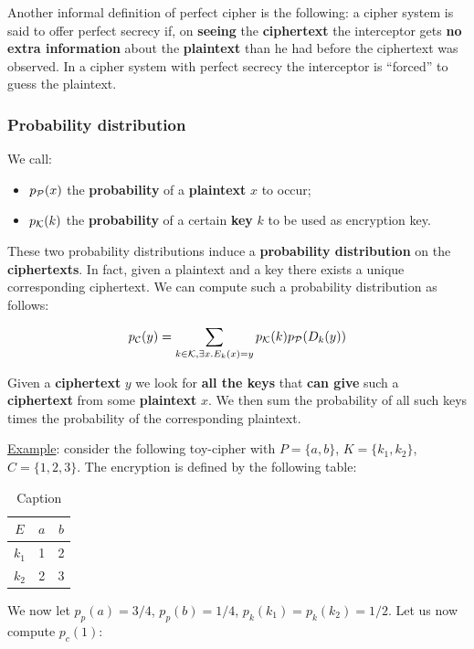 Another informal definition of perfect cipher is the following: a cipher system is said to offer perfect secrecy if, on \textbf{seeing} the \textbf{ciphertext} the interceptor gets \textbf{no extra information} about the \textbf{plaintext} than he had before the ciphertext was observed. In a cipher system with perfect secrecy the interceptor is “forced” to guess the plaintext.

\subsubsection{Probability distribution}

We call:

\begin{itemize}
    \item $p_{\cal P}(x)$ the \textbf{probability} of a \textbf{plaintext} $x$ to occur;
    \item $p_{\cal K}(k)$ the \textbf{probability} of a certain \textbf{key} $k$ to be used as encryption key.
\end{itemize}

These two probability distributions induce a \textbf{probability distribution} on the \textbf{ciphertexts}. In fact, given a plaintext and a key there exists a unique corresponding ciphertext. We can compute such a probability distribution as follows:

$$
p_{\cal C}(y) = \displaystyle \sum_{k \in {\cal K}, \exists x . E_k(x)=y} {p_{\cal K}(k) p_{\cal P}(D_k(y))}
$$

Given a \textbf{ciphertext} $y$ we look for \textbf{all the keys} that \textbf{can give} such a \textbf{ciphertext} from some \textbf{plaintext} $x$. We then sum the probability of all such keys times the probability of the corresponding plaintext.

\underline{Example}: consider the following toy-cipher with $P = \{a,b\}$, $K = \{k_1,k_2\}$, $C = \{1,2,3\}$. The encryption is defined by the following table:

\begin{table}[h!]
    \centering
    \begin{tabular}{c|c|c}
        $E$ & $a$ & $b$ \\
        \hline 
        $k_1$ & 1 & 2 \\
        $k_2$ & 2 & 3
    \end{tabular}
    \caption{Caption}
    \label{tab:my_label}
\end{table}

We now let $p_p(a) = 3/4$, $p_p(b) = 1/4$, $p_k(k_1) = p_k(k_2) = 1/2$. Let us now compute $p_c(1)$:

